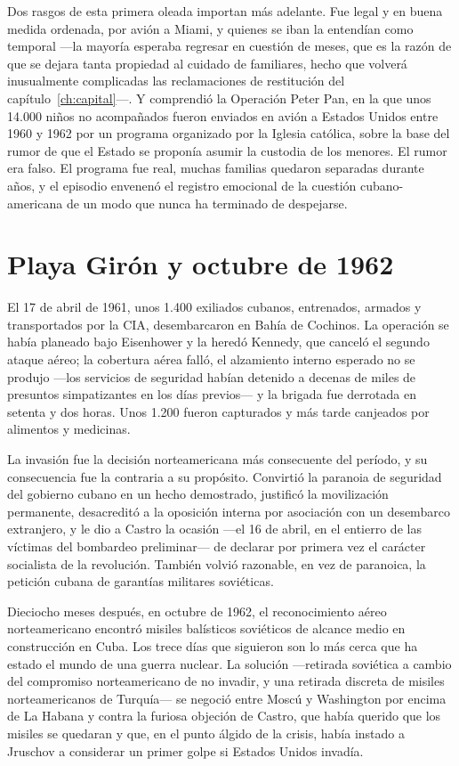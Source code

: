 Dos rasgos de esta primera oleada importan más adelante. Fue legal y en buena
medida ordenada, por avión a Miami, y quienes se iban la entendían como temporal
---la mayoría esperaba regresar en cuestión de meses, que es la razón de que se
dejara tanta propiedad al cuidado de familiares, hecho que volverá inusualmente
complicadas las reclamaciones de restitución del capítulo~\ref{ch:capital}---. Y
comprendió la Operación Peter Pan, en la que unos 14.000 niños no acompañados
fueron enviados en avión a Estados Unidos entre 1960 y 1962 por un programa
organizado por la Iglesia católica, sobre la base del rumor de que el Estado se
proponía asumir la custodia de los menores. El rumor era falso. El programa fue
real, muchas familias quedaron separadas durante años, y el episodio envenenó el
registro emocional de la cuestión cubano-americana de un modo que nunca ha
terminado de despejarse.

\section{Playa Girón y octubre de 1962}

El 17 de abril de 1961, unos 1.400 exiliados cubanos, entrenados, armados y
transportados por la CIA, desembarcaron en Bahía de Cochinos. La operación se
había planeado bajo Eisenhower y la heredó Kennedy, que canceló el segundo ataque
aéreo; la cobertura aérea falló, el alzamiento interno esperado no se produjo
---los servicios de seguridad habían detenido a decenas de miles de presuntos
simpatizantes en los días previos--- y la brigada fue derrotada en setenta y dos
horas. Unos 1.200 fueron capturados y más tarde canjeados por alimentos y
medicinas.

La invasión fue la decisión norteamericana más consecuente del período, y su
consecuencia fue la contraria a su propósito. Convirtió la paranoia de seguridad
del gobierno cubano en un hecho demostrado, justificó la movilización permanente,
desacreditó a la oposición interna por asociación con un desembarco extranjero, y
le dio a Castro la ocasión ---el 16 de abril, en el entierro de las víctimas del
bombardeo preliminar--- de declarar por primera vez el carácter socialista de la
revolución. También volvió razonable, en vez de paranoica, la petición cubana de
garantías militares soviéticas.

Dieciocho meses después, en octubre de 1962, el reconocimiento aéreo
norteamericano encontró misiles balísticos soviéticos de alcance medio en
construcción en Cuba. Los trece días que siguieron son lo más cerca que ha estado
el mundo de una guerra nuclear. La solución ---retirada soviética a cambio del
compromiso norteamericano de no invadir, y una retirada discreta de misiles
norteamericanos de Turquía--- se negoció entre Moscú y Washington por encima de
La Habana y contra la furiosa objeción de Castro, que había querido que los
misiles se quedaran y que, en el punto álgido de la crisis, había instado a
Jruschov a considerar un primer golpe si Estados Unidos invadía.

